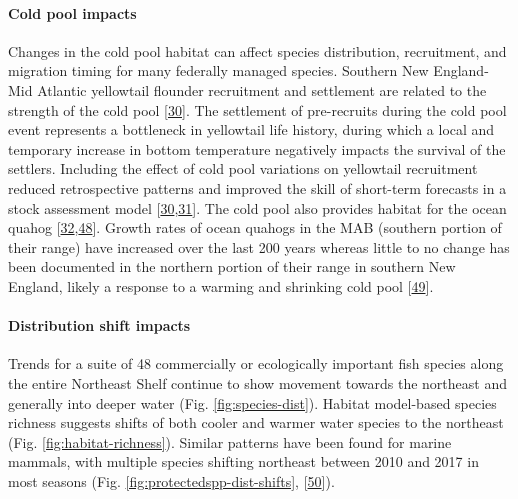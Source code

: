 \documentclass[
  10pt,
]{article}
\begin{document}
\hypertarget{cold-pool-impacts}{%
\paragraph{Cold pool impacts}\label{cold-pool-impacts}}

Changes in the cold pool habitat can affect species distribution, recruitment, and migration timing for many federally managed species. Southern New England-Mid Atlantic yellowtail flounder recruitment and settlement are related to the strength of the cold pool {[}\protect\hyperlink{ref-miller_state-space_2016}{30}{]}. The settlement of pre-recruits during the cold pool event represents a bottleneck in yellowtail life history, during which a local and temporary increase in bottom temperature negatively impacts the survival of the settlers. Including the effect of cold pool variations on yellowtail recruitment reduced retrospective patterns and improved the skill of short-term forecasts in a stock assessment model {[}\protect\hyperlink{ref-miller_state-space_2016}{30},\protect\hyperlink{ref-du_pontavice_incorporating_nodate}{31}{]}. The cold pool also provides habitat for the ocean quahog {[}\protect\hyperlink{ref-friedland_middle_2022}{32},\protect\hyperlink{ref-powell_ocean_2020}{48}{]}. Growth rates of ocean quahogs in the MAB (southern portion of their range) have increased over the last 200 years whereas little to no change has been documented in the northern portion of their range in southern New England, likely a response to a warming and shrinking cold pool {[}\protect\hyperlink{ref-pace_two-hundred_2018}{49}{]}.

\hypertarget{distribution-shift-impacts}{%
\paragraph{Distribution shift impacts}\label{distribution-shift-impacts}}

Trends for a suite of 48 commercially or ecologically important fish species along the entire Northeast Shelf continue to show movement towards the northeast and generally into deeper water (Fig. \ref{fig:species-dist}). Habitat model-based species richness suggests shifts of both cooler and warmer water species to the northeast (Fig. \ref{fig:habitat-richness}). Similar patterns have been found for marine mammals, with multiple species shifting northeast between 2010 and 2017 in most seasons (Fig. \ref{fig:protectedspp-dist-shifts}, {[}\protect\hyperlink{ref-chavez-rosales_detection_2022}{50}{]}).
\end{document}

